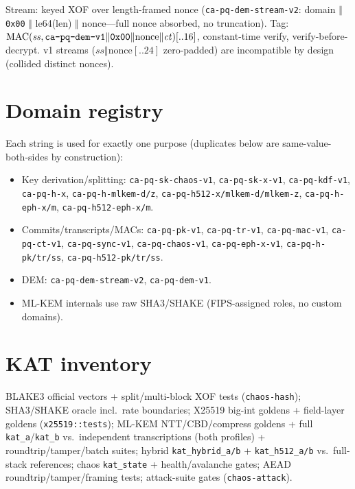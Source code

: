 \documentclass[11pt,a4paper]{article}
\begin{document}
Stream: keyed XOF over length-framed nonce (\texttt{ca-pq-dem-stream-v2}:
domain $\Vert$ \texttt{0x00} $\Vert$ le64(len) $\Vert$ nonce---full nonce
absorbed, no truncation). Tag: $\mathrm{MAC}(\mathit{ss},
\text{\texttt{ca-pq-dem-v1}} \Vert \texttt{0x00} \Vert \mathrm{nonce} \Vert
\mathit{ct})[..16]$, constant-time verify, verify-before-decrypt. v1 streams
($\mathit{ss} \Vert \mathrm{nonce}[..24]$ zero-padded) are incompatible by design
(collided distinct nonces).

\section{Domain registry}
\label{sec:domains}

Each string is used for exactly one purpose (duplicates below are
same-value-both-sides by construction):
\begin{itemize}[leftmargin=2em]
\item Key derivation/splitting: \texttt{ca-pq-sk-chaos-v1},
\texttt{ca-pq-sk-x-v1}, \texttt{ca-pq-kdf-v1}, \texttt{ca-pq-h-x},
\texttt{ca-pq-h-mlkem-d/z}, \texttt{ca-pq-h512-x/mlkem-d/mlkem-z},
\texttt{ca-pq-h-eph-x/m}, \texttt{ca-pq-h512-eph-x/m}.
\item Commits/transcripts/MACs: \texttt{ca-pq-pk-v1}, \texttt{ca-pq-tr-v1},
\texttt{ca-pq-mac-v1}, \texttt{ca-pq-ct-v1}, \texttt{ca-pq-sync-v1},
\texttt{ca-pq-chaos-v1}, \texttt{ca-pq-eph-x-v1}, \texttt{ca-pq-h-pk/tr/ss},
\texttt{ca-pq-h512-pk/tr/ss}.
\item DEM: \texttt{ca-pq-dem-stream-v2}, \texttt{ca-pq-dem-v1}.
\item ML-KEM internals use raw SHA3/SHAKE (FIPS-assigned roles, no custom domains).
\end{itemize}

\section{KAT inventory}
\label{sec:kats}

BLAKE3 official vectors + split/multi-block XOF tests (\texttt{chaos-hash});
SHA3/SHAKE oracle incl.\ rate boundaries; X25519 big-int goldens + field-layer
goldens (\texttt{x25519::tests}); ML-KEM NTT/CBD/compress goldens + full
\texttt{kat\_a}/\texttt{kat\_b} vs.\ independent transcriptions (both profiles) +
roundtrip/tamper/batch suites; hybrid \texttt{kat\_hybrid\_a/b} +
\texttt{kat\_h512\_a/b} vs.\ full-stack references; chaos \texttt{kat\_state} +
health/avalanche gates; AEAD roundtrip/tamper/framing tests; attack-suite gates
(\texttt{chaos-attack}).
\end{document}

